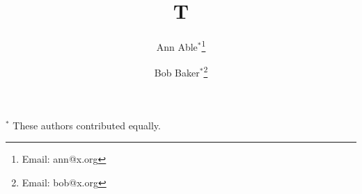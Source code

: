 \documentclass{article}
\title{T}
\author{Ann Able$^{*}$\thanks{Email: ann@x.org} \and Bob Baker$^{*}$\thanks{Email: bob@x.org}}
\date{}
\begin{document}
\maketitle
$^{*}$ These authors contributed equally.
\end{document}
